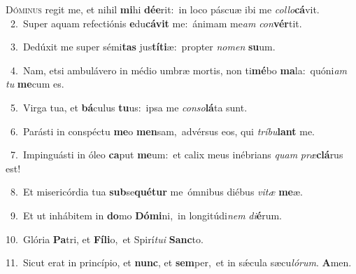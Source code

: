 \lettrine{\initial\textcolor{\initialcolor}{D}}{óminus} regit me, et nihil \textbf{mi}\-hi \textbf{dé}\-\textbf{e}rit:~\star in loco páscuæ ibi me \textit{col}\-\textit{lo}\textbf{cá}vit.\\
{\numbfont\textcolor{\numbcolor}{~2.}}~Super aquam refectiónis \textbf{e}\-du\-\textbf{cá}\-\textbf{vit} me:~\star ánimam me\textit{am} \textit{con}\-\textbf{vér}tit.\par
{\numbfont\textcolor{\numbcolor}{~3.}}~Dedúxit me super sémi\textbf{tas} jus\-\textbf{tí}\-\textbf{ti}æ:~\star propter \textit{no}\-\textit{men} \textbf{su}\-um.\par
{\numbfont\textcolor{\numbcolor}{~4.}}~Nam, etsi ambulávero in médio umbræ mortis, non ti\-\textbf{mé}\-bo \textbf{ma}\-la:~\star quóni\textit{am} \textit{tu} \textbf{me}\-cum es.\par
{\numbfont\textcolor{\numbcolor}{~5.}}~Virga tua, et \textbf{bá}\-culus \textbf{tu}\-us:~\star ipsa me \textit{con}\-\textit{so}\textbf{lá}ta sunt.\par
{\numbfont\textcolor{\numbcolor}{~6.}}~Parásti in conspéctu \textbf{me}\-o \textbf{men}\-sam,~\star advérsus eos, qui \textit{trí}\-\textit{bu}\textbf{lant} me.\par
{\numbfont\textcolor{\numbcolor}{~7.}}~Impinguásti in óleo \textbf{ca}\-put \textbf{me}\-um:~\star et calix meus inébrians \textit{quam} \textit{præ}\-\textbf{clá}rus est!\par
{\numbfont\textcolor{\numbcolor}{~8.}}~Et misericórdia tua \textbf{sub}\-se\-\textbf{qué}\-\textbf{tur} me~\star ómnibus diébus \textit{vi}\-\textit{tæ} \textbf{me}\-æ.\par
{\numbfont\textcolor{\numbcolor}{~9.}}~Et ut inhábitem in \textbf{do}\-mo \textbf{Dó}\-\textbf{mi}ni,~\star in longitúdi\textit{nem} \textit{di}\-\textbf{é}rum.\par
{\numbfont\textcolor{\numbcolor}{10.}}~Glória \textbf{Pa}\-tri, et \textbf{Fí}\-\textbf{li}o,~\star et Spirí\-\textit{tu}\-\textit{i} \textbf{Sanc}\-to.\par
{\numbfont\textcolor{\numbcolor}{11.}}~Sicut erat in princípio, et \textbf{nunc}\-, et \textbf{sem}\-per,~\star et in sǽcula sæcu\-\textit{ló}\-\textit{rum}. \textbf{A}\-men.\par
